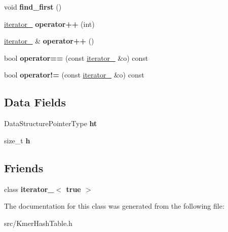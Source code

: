 \begin{DoxyCompactItemize}
void {\bfseries find\+\_\+first} ()
\item 
\mbox{\label{classMinimizerHashTable_1_1iterator___ac86ac22dd876e806fe11758b5650bb21}} 
\hyperlink{classMinimizerHashTable_1_1iterator__}{iterator\+\_\+} {\bfseries operator++} (int)
\item 
\mbox{\label{classMinimizerHashTable_1_1iterator___a5be8ef598b6173fdd95a75a5b6f0712c}} 
\hyperlink{classMinimizerHashTable_1_1iterator__}{iterator\+\_\+} \& {\bfseries operator++} ()
\item 
\mbox{\label{classMinimizerHashTable_1_1iterator___af0bec3c6fb8db100def7e6756a4ca08b}} 
bool {\bfseries operator==} (const \hyperlink{classMinimizerHashTable_1_1iterator__}{iterator\+\_\+} \&o) const
\item 
\mbox{\label{classMinimizerHashTable_1_1iterator___a40c8eba39b0408e8155d9cc67d0cbbf9}} 
bool {\bfseries operator!=} (const \hyperlink{classMinimizerHashTable_1_1iterator__}{iterator\+\_\+} \&o) const
\end{DoxyCompactItemize}
\subsection*{Data Fields}
\begin{DoxyCompactItemize}
\item 
\mbox{\label{classMinimizerHashTable_1_1iterator___a372226f316dfa9c17756465a275f64b9}} 
Data\+Structure\+Pointer\+Type {\bfseries ht}
\item 
\mbox{\label{classMinimizerHashTable_1_1iterator___aa563ae2bd70dae53c25a6a5291e75fc4}} 
size\+\_\+t {\bfseries h}
\end{DoxyCompactItemize}
\subsection*{Friends}
\begin{DoxyCompactItemize}
\item 
\mbox{\label{classMinimizerHashTable_1_1iterator___a97892b3c6f1f1c933ebed425135d20cb}} 
class {\bfseries iterator\+\_\+$<$ true $>$}
\end{DoxyCompactItemize}


The documentation for this class was generated from the following file\+:\begin{DoxyCompactItemize}
\item 
src/Kmer\+Hash\+Table.\+h\end{DoxyCompactItemize}
